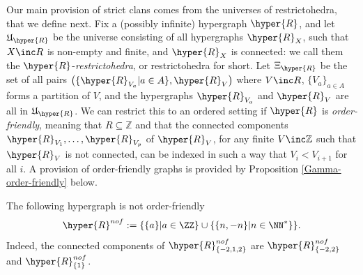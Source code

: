  Our main provision of strict clans comes from the universes of restrictohedra, that we define next.
Fix a (possibly infinite) hypergraph $\hyper{R}$, and let $\mathfrak{U}_{\hyper{R}}$ be the universe consisting of all hypergraphs $\hyper{R}_X$,   such that $X\inc R$ is non-empty and finite, and  $\hyper{R}_X$ is connected: we call them the $\hyper{R}$-{\em restrictohedra}, or restrictohedra for short. Let $\Xi_\hyper{R}$ be the set of all pairs $\left( \{\hyper{R}_{V_a}|a\in A\}, \hyper{R}_V\right)$
where $V\inc R$,
 $\{V_a\}_{a \in A}$ forms a partition of $V$, and the hypergraphs $\hyper{R}_{V_a}$ and $\hyper{R}_V$ are all in $\mathfrak{U}_\hyper{R}$.
 We can restrict this to an ordered setting if $\hyper{R}$ is {\em order-friendly}, meaning that $R\subseteq\mathbb{Z}$ and that the connected components $\hyper{R}_{V_1},\ldots,\hyper{R}_{V_p}$ of $\hyper{R}_V$, for any finite $V\inc\mathbb{Z}$ such that $\hyper{R}_V$ is not connected, can be indexed in such a way that $V_i<V_{i+1}$ for all $i$.  A provision of order-friendly graphs is provided by Proposition \ref{Gamma-order-friendly} below. 
 
 \begin{example}
 The following hypergraph is not order-friendly
 \begin{equation*}
 \hyper{R}^{nof}:=\{\{a\}|a \in \ZZ \} \cup \{\{n,-n\}|n \in \NN^*\}\}.
 \end{equation*}
 Indeed, the connected components of  $\hyper{R}^{nof}_{\{-2,1,2\}}$ are $\hyper{R}^{nof}_{\{-2,2\}}$ and $\hyper{R}^{nof}_{\{1\}}$. \demo
 \end{example}
 
